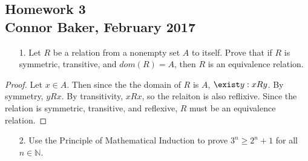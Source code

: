 \documentclass[10pt]{article}
\theoremstyle{definition}
\theoremstyle{plain}
\newcommand{\N}{\mathbb{N}}
\begin{document}
\begin{center}
  \subsection*{Homework 3\\Connor Baker, February 2017}
\end{center}

\begin{enumerate}
\item[1.] Let $R$ be a relation from a nonempty set $A$ to itself.  Prove that if $R$ is symmetric, transitive, and $dom(R) = A$, then $R$ is an equivalence relation.
\end{enumerate}

\begin{proof}
  Let $x\in A$. Then since the the domain of $R$ is $A$, $\exist y: xRy$. By symmetry, $yRx$. By transitivity, $xRx$, so the relaiton is also reflixive. Since the relation is symmetric, transitive, and reflexive, $R$ must be an equivalence relation.
\end{proof}



\pagebreak



\begin{enumerate}
  \item[2.] Use the Principle of Mathematical Induction to prove $3^n \geq 2^n + 1$ for all $n \in \N$.
\end{enumerate}
\end{document}
